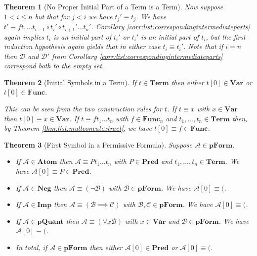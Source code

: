 \documentclass[12pt]{article}
\theoremstyle{break}
\theoremstyle{break}
\newtheorem{theorem}{Theorem}[section]
\theoremstyle{break}
\theoremstyle{break}
\theoremstyle{break}
\newtheorem{informal definition}[definition]{Informal Definition}
\newcommand{\mc}[1]{\mathcal{#1}}
\begin{document}
\begin{theorem}[No Proper Initial Part of a Term is a Term]
Now suppose $1<i \le n$ but that for $j<i$ we have $t_j' \equiv t_j$.
We have $t'\equiv f t_1\ldots t_{i-1} \circ t_i' \circ t_{i+1}'\ldots t_n'$.
Corollary \ref{corr:list:correspondingintermediateparts} again implies $t_i$ is an initial part of $t_i'$ or $t_i'$ is an initial part of $t_i$, but the first induction hypothesis again yields that in either case $t_i\equiv t_i'$. Note that if $i = n$ then $\mc{D}$ and $\mc{D}'$ from Corollary \ref{corr:list:correspondingintermediateparts} correspond both to the empty set.
\end{theorem}

\begin{theorem}[Initial Symbols in a Term]
\label{thm:read:initsymbterm}
If $t\in \textbf{Term}$ then either $t[0]\in\textbf{Var}$ or $t[0]\in\textbf{Func}$.

This can be seen from the two construction rules for $t$.
If $t\equiv x$ with $x\in\textbf{Var}$ then $t[0]\equiv x \in\textbf{Var}$.
If $t\equiv f t_1\ldots t_n$ with $f\in\textbf{Func}_n$ and $t_1,\ldots, t_n\in\textbf{Term}$ then, by Theorem \ref{thm:list:multconcatextract}, we have $t[0] \equiv f \in \textbf{Func}$.
\end{theorem}

\begin{theorem}[First Symbol in a Permissive Formula]
\label{thm:read:pformfirstsymb}
Suppose $\mc{A}\in\textbf{pForm}$.
\begin{itemize}
\item{If $\mc{A}\in\textbf{Atom}$ then $\mc{A}\equiv Pt_1\ldots t_n$ with $P\in\textbf{Pred}$ and $t_1,\ldots,t_n\in\textbf{Term}$. We have $\mc{A}[0] \equiv P \in \textbf{Pred}$.}
\item{If $\mc{A}\in\textbf{Neg}$ then $\mc{A}\equiv (\lnot \mc{B})$ with $\mc{B}\in\textbf{pForm}$. We have $\mc{A}[0] \equiv ($.}
\item{If $\mc{A}\in\textbf{Imp}$ then $\mc{A}\equiv(\mc{B}\implies \mc{C})$ with $\mc{B}, \mc{C} \in \textbf{pForm}$. We have $\mc{A}[0] \equiv ($.}
\item{If $\mc{A}\in\textbf{pQuant}$ then $\mc{A}\equiv (\forall x \mc{B})$ with $x\in\textbf{Var}$ and $\mc{B}\in\textbf{pForm}$. We have $\mc{A}[0] \equiv ($.}
\item{In total, if $\mc{A}\in\textbf{pForm}$ then either $\mc{A}[0] \in \textbf{Pred}$ or $\mc{A}[0] \equiv ($.}
\end{itemize}
\end{theorem}
\end{document}
